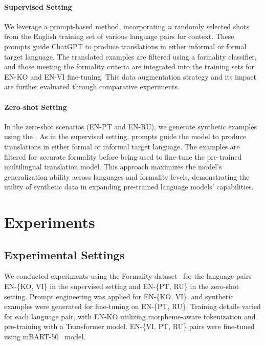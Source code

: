 \documentclass{article}
\theoremstyle{plain}
\theoremstyle{definition}
\theoremstyle{remark}
\begin{document}
\paragraph{Supervised Setting}
We leverage a prompt-based method, incorporating $n$ randomly selected shots from the English training set of various language pairs for context. These prompts guide ChatGPT to produce translations in either informal or formal target language. The translated examples are filtered using a formality classifier, and those meeting the formality criteria are integrated into the training sets for EN-KO and EN-VI fine-tuning. This data augmentation strategy and its impact are further evaluated through comparative experiments.

\paragraph{Zero-shot Setting}
In the zero-shot scenarios (EN-PT and EN-RU), we generate synthetic examples using the \citet{Gopalakrishnan2019}. As in the supervised setting, prompts guide the model to produce translations in either formal or informal target language. The examples are filtered for accurate formality before being used to fine-tune the pre-trained multilingual translation model. This approach maximizes the model's generalization ability across languages and formality levels, demonstrating the utility of synthetic data in expanding pre-trained language models' capabilities.


\section{Experiments}
\subsection{Experimental Settings}
We conducted experiments using the Formality dataset~\cite{nuadejde2022cocoa} for the language pairs EN-\{KO, VI\} in the supervised setting and EN-\{PT, RU\} in the zero-shot setting. Prompt engineering was applied for EN-\{KO, VI\}, and synthetic examples were generated for fine-tuning on EN-\{PT, RU\}. Training details varied for each language pair, with EN-KO utilizing morpheme-aware tokenization and pre-training with a Transformer model. EN-\{VI, PT, RU\} pairs were fine-tuned using mBART-50~\cite{liu2020multilingual} model. 
\end{document}
